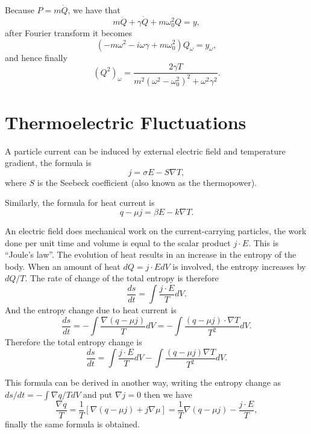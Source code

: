 \documentclass{book}
\numberwithin{equation}{section}
\begin{document}
Because $P=m\dot{Q}$, we have that
\begin{equation}
  m\ddot{Q}+\gamma\dot{Q}+m\omega_0^2Q=y,
\end{equation}
after Fourier transform it becomes
\begin{equation}
  (-m\omega^2-i\omega\gamma+m\omega_0^2)Q_\omega=y_\omega,
\end{equation}
and hence finally 
\begin{equation}
  (Q^2)_\omega=\frac{2\gamma T}{m^2(\omega^2-\omega_0^2)^2+\omega^2\gamma^2}.
\end{equation}

\section{Thermoelectric Fluctuations}
A particle current can be induced by external electric field and
temperature gradient, the formula is
\begin{equation}
  j=\sigma E-S\nabla T,
\end{equation}
where $S$ is the Seebeck coefficient (also known as the thermopower).

Similarly, the formula for heat current is
\begin{equation}
  q-\mu j=\beta E-k\nabla T.
\end{equation}

An electric field does mechanical work on the current-carrying
particles, the work done per unit time and volume is equal to the
scalar product $j\cdot E$. This is ``Joule's law''. The evolution of
heat results in an increase in the entropy of the body. When an amount
of heat $dQ=j\cdot EdV$ is involved, the entropy increases by $dQ/T$.
The rate of change of the total entropy is therefore
\begin{equation}
  \frac{ds}{dt}=\int\frac{j\cdot E}{T}dV.
\end{equation}
And the entropy change due to heat current is
\begin{equation}
  \frac{ds}{dt}=-\int\frac{\nabla(q-\mu j)}{T}dV=
  -\int\frac{(q-\mu j)\cdot\nabla T}{T^2}dV.
\end{equation}
Therefore the total entropy change is
\begin{equation}
  \frac{ds}{dt}=\int\frac{j\cdot E}{T}dV-\int\frac{(q-\mu j)\nabla T}{T^2}dV.
\end{equation}

This formula can be derived in another way, writing the entropy change as
$ds/dt=-\int\nabla q/TdV$ and put $\nabla j=0$ then we have
\begin{equation}
  \frac{\nabla q}{T}=\frac{1}{T}[\nabla(q-\mu j)+j\nabla\mu]=
  \frac{1}{T}\nabla(q-\mu j)-\frac{j\cdot E}{T},
\end{equation}
finally the same formula is obtained.
\end{document}
